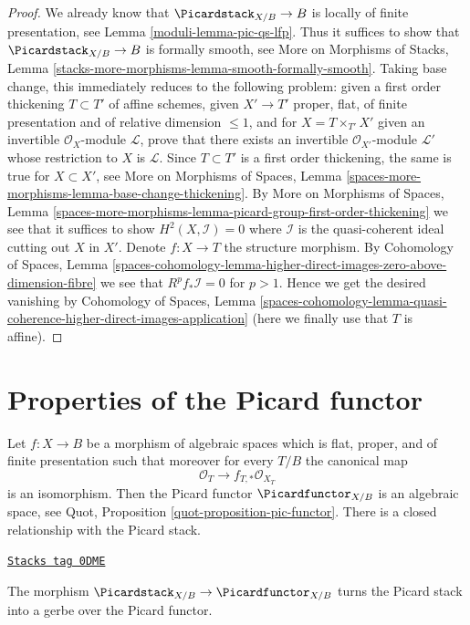 \begin{proof}

We already know that $\Picardstack_{X/B} \to B$ is
locally of finite presentation, see Lemma \ref{moduli-lemma-pic-qs-lfp}.
Thus it suffices to show that $\Picardstack_{X/B} \to B$ is
formally smooth, see More on Morphisms of Stacks, Lemma
\ref{stacks-more-morphisms-lemma-smooth-formally-smooth}.
Taking base change, this immediately reduces to the following
problem: given a first order thickening $T \subset T'$
of affine schemes, given $X' \to T'$ proper, flat, of finite
presentation and of relative dimension $\leq 1$, and
for $X = T \times_{T'} X'$ given an invertible $\mathcal{O}_X$-module
$\mathcal{L}$, prove that there exists an invertible
$\mathcal{O}_{X'}$-module $\mathcal{L}'$ whose
restriction to $X$ is $\mathcal{L}$.
Since $T \subset T'$ is a first order thickening, the
same is true for $X \subset X'$, see
More on Morphisms of Spaces, Lemma
\ref{spaces-more-morphisms-lemma-base-change-thickening}.
By More on Morphisms of Spaces, Lemma
\ref{spaces-more-morphisms-lemma-picard-group-first-order-thickening}
we see that it suffices to show $H^2(X, \mathcal{I}) = 0$
where $\mathcal{I}$ is the quasi-coherent ideal cutting out $X$ in $X'$.
Denote $f : X \to T$ the structure morphism.
By Cohomology of Spaces, Lemma
\ref{spaces-cohomology-lemma-higher-direct-images-zero-above-dimension-fibre}
we see that $R^pf_*\mathcal{I} = 0$ for $p > 1$.
Hence we get the desired vanishing by
Cohomology of Spaces, Lemma
\ref{spaces-cohomology-lemma-quasi-coherence-higher-direct-images-application}
(here we finally use that $T$ is affine).
\end{proof}

\section{Properties of the Picard functor}
\label{moduli-section-picard-functor}
Let $f : X \to B$ be a morphism of algebraic spaces which is flat,
proper, and of finite presentation such that moreover for every $T/B$
the canonical map
$$
\mathcal{O}_T \longrightarrow f_{T, *}\mathcal{O}_{X_T}
$$
is an isomorphism. Then the Picard functor $\Picardfunctor_{X/B}$ is an
algebraic space, see Quot, Proposition \ref{quot-proposition-pic-functor}.
There is a closed relationship with the Picard stack.

\begin{lemma}
\label{moduli-lemma-pic-gerbe-over-pic-functor}
\href{https://stacks.math.columbia.edu/tag/0DME}{\texttt{Stacks tag 0DME}}

The morphism $\Picardstack_{X/B} \to \Picardfunctor_{X/B}$
turns the Picard stack into a gerbe over the Picard functor.
\end{lemma}

